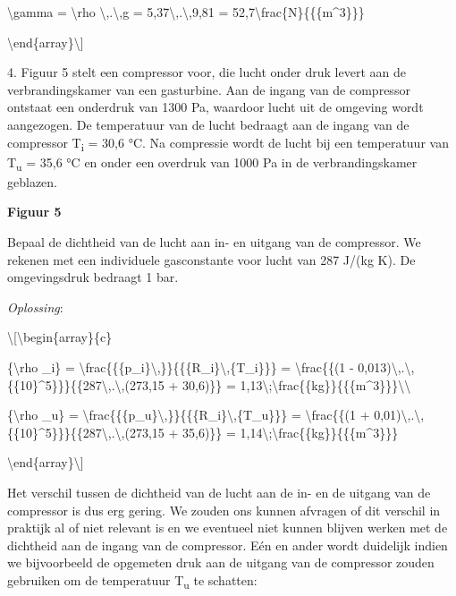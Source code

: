 \documentclass[]{article}
\begin{document}
\textbackslash{}gamma = \textbackslash{}rho
\textbackslash{},.\textbackslash{},g =
5,37\textbackslash{},.\textbackslash{},9,81 =
52,7\textbackslash{}frac\{N\}\{\{\{m\^{}3\}\}\}

\textbackslash{}end\{array\}\textbackslash{}{]}

4. Figuur 5 stelt een compressor voor, die lucht onder druk levert aan
de verbrandingskamer van een gasturbine. Aan de ingang van de compressor
ontstaat een onderdruk van 1300 Pa, waardoor lucht uit de omgeving wordt
aangezogen. De temperatuur van de lucht bedraagt aan de ingang van de
compressor T\textsubscript{i} = 30,6 °C. Na compressie wordt de lucht
bij een temperatuur van T\textsubscript{u} = 35,6 °C en onder een
overdruk van 1000 Pa in de verbrandingskamer geblazen.

\textbf{Figuur 5}

Bepaal de dichtheid van de lucht aan in- en uitgang van de compressor.
We rekenen met een individuele gasconstante voor lucht van 287 J/(kg K).
De omgevingsdruk bedraagt 1 bar.

\emph{Oplossing}:

\textbackslash{}{[}\textbackslash{}begin\{array\}\{c\}

\{\textbackslash{}rho \_i\} =
\textbackslash{}frac\{\{\{p\_i\}\textbackslash{},\}\}\{\{\{R\_i\}\textbackslash{},\{T\_i\}\}\}
= \textbackslash{}frac\{\{(1 -
0,013)\textbackslash{},.\textbackslash{},\{\{10\}\^{}5\}\}\}\{\{287\textbackslash{},.\textbackslash{},(273,15
+ 30,6)\}\} =
1,13\textbackslash{};\textbackslash{}frac\{\{kg\}\}\{\{\{m\^{}3\}\}\}\textbackslash{}\textbackslash{}

\{\textbackslash{}rho \_u\} =
\textbackslash{}frac\{\{\{p\_u\}\textbackslash{},\}\}\{\{\{R\_i\}\textbackslash{},\{T\_u\}\}\}
= \textbackslash{}frac\{\{(1 +
0,01)\textbackslash{},.\textbackslash{},\{\{10\}\^{}5\}\}\}\{\{287\textbackslash{},.\textbackslash{},(273,15
+ 35,6)\}\} =
1,14\textbackslash{};\textbackslash{}frac\{\{kg\}\}\{\{\{m\^{}3\}\}\}

\textbackslash{}end\{array\}\textbackslash{}{]}

Het verschil tussen de dichtheid van de lucht aan de in- en de uitgang
van de compressor is dus erg gering. We zouden ons kunnen afvragen of
dit verschil in praktijk al of niet relevant is en we eventueel niet
kunnen blijven werken met de dichtheid aan de ingang van de compressor.
Eén en ander wordt duidelijk indien we bijvoorbeeld de opgemeten druk
aan de uitgang van de compressor zouden gebruiken om de temperatuur
T\textsubscript{u} te schatten:
\end{document}

